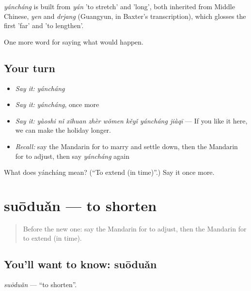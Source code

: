 \begin{cousinweb}
\emph{yáncháng} is built from \emph{yán} 'to stretch' and  'long', both inherited from Middle Chinese, \emph{yen} and \emph{drjang} (Guangyun, in Baxter's transcription), which glosses the first 'far' and 'to lengthen'.
\end{cousinweb}

\begin{grammarlens}[title={What you've built}]
One more word for saying what would happen.
\end{grammarlens}

\subsection*{Your turn}
\begin{itemize}
\raggedright
  \item \emph{Say it:} \emph{yáncháng}
  \item \emph{Say it:} \emph{yáncháng}, once more
  \item \emph{Say it:} \emph{yàoshi nǐ xǐhuan zhèr wǒmen kěyǐ yáncháng jiàqī} — If you like it here, we can make the holiday longer.
  \item \emph{Recall:} say the Mandarin for to marry and settle down, then the Mandarin for to adjust, then say \emph{yáncháng} again
\end{itemize}

\begin{tcolorbox}[breakable,colback=teal!4,colframe=teal!35!black,title={Before you move on}]
What does yáncháng mean? (\textquotedblleft{}To extend (in time)\textquotedblright{}.) Say it once more.
\end{tcolorbox}
\section[suōduǎn]{suōduǎn — to shorten}

\label{lesson:ZH-C400-suoduan}



\begin{quote}
Before the new one: say the Mandarin for to adjust, then the Mandarin for to extend (in time).
\end{quote}

\subsection*{You'll want to know: suōduǎn}
\emph{suōduǎn} — \textquotedblleft{}to shorten\textquotedblright{}.

